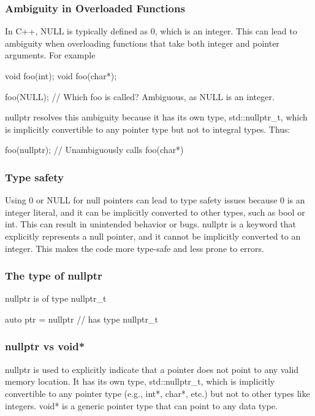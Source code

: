 \documentclass{report}
\begin{document}
    \subsubsection{Ambiguity in Overloaded Functions}
    \bigbreak \noindent 
    In C++, NULL is typically defined as 0, which is an integer. This can lead to ambiguity when overloading functions that take both integer and pointer arguments. For example
    \bigbreak \noindent 
    \begin{cppcode}
        void foo(int);
        void foo(char*);

        foo(NULL); // Which foo is called? Ambiguous, as NULL is an integer.
    \end{cppcode}
    \bigbreak \noindent 
    nullptr resolves this ambiguity because it has its own type, std::nullptr\_t, which is implicitly convertible to any pointer type but not to integral types. Thus:
    \bigbreak \noindent 
    \begin{cppcode}
        foo(nullptr); // Unambiguously calls foo(char*)
    \end{cppcode}

    \bigbreak \noindent 
    \subsubsection{Type safety}
    \bigbreak \noindent 
    Using 0 or NULL for null pointers can lead to type safety issues because 0 is an integer literal, and it can be implicitly converted to other types, such as bool or int. This can result in unintended behavior or bugs.
    \bigbreak \noindent 
    nullptr is a keyword that explicitly represents a null pointer, and it cannot be implicitly converted to an integer. This makes the code more type-safe and less prone to errors.
    \bigbreak \noindent 
    \subsubsection{The type of nullptr}
    \bigbreak \noindent 
    nullptr is of type nullptr\_t
    \bigbreak \noindent 
    \begin{cppcode}
    auto ptr = nullptr // has type nullptr\_t
    \end{cppcode}

    \bigbreak \noindent 
    \subsubsection{nullptr vs void*}
    \bigbreak \noindent 
    nullptr is used to explicitly indicate that a pointer does not point to any valid memory location.
    \bigbreak \noindent 
    It has its own type, std::nullptr\_t, which is implicitly convertible to any pointer type (e.g., int*, char*, etc.) but not to other types like integers.
    \bigbreak \noindent 
    void* is a generic pointer type that can point to any data type.
\end{document}
